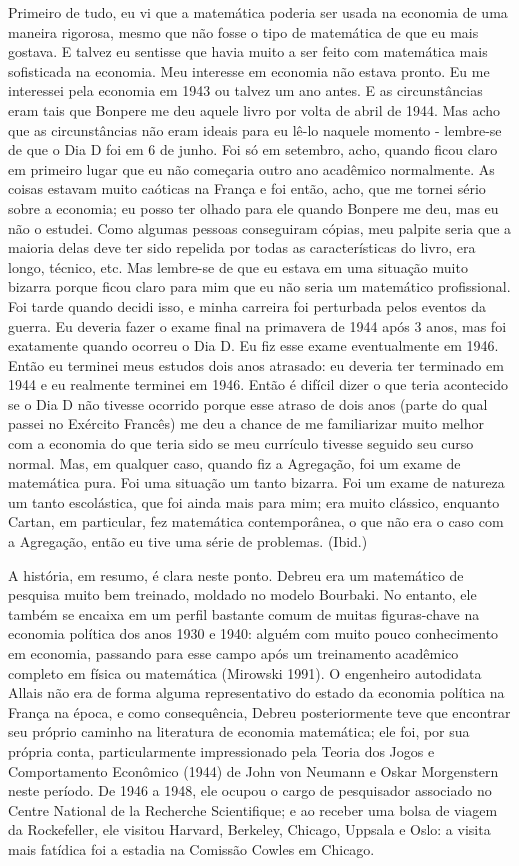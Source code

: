 \documentclass[12pt]{article}
\begin{document}
Primeiro de tudo, eu vi que a matemática poderia ser usada na economia de uma maneira rigorosa, mesmo que não fosse o tipo de matemática de que eu mais gostava. E talvez eu sentisse que havia muito a ser feito com matemática mais sofisticada na economia. Meu interesse em economia não estava pronto. Eu me interessei pela economia em 1943 ou talvez um ano antes. E as circunstâncias eram tais que Bonpere me deu aquele livro por volta de abril de 1944. Mas acho que as circunstâncias não eram ideais para eu lê-lo naquele momento - lembre-se de que o Dia D foi em 6 de junho. Foi só em setembro, acho, quando ficou claro em primeiro lugar que eu não começaria outro ano acadêmico normalmente. As coisas estavam muito caóticas na França e foi então, acho, que me tornei sério sobre a economia; eu posso ter olhado para ele quando Bonpere me deu, mas eu não o estudei. Como algumas pessoas conseguiram cópias, meu palpite seria que a maioria delas deve ter sido repelida por todas as características do livro, era longo, técnico, etc. Mas lembre-se de que eu estava em uma situação muito bizarra porque ficou claro para mim que eu não seria um matemático profissional. Foi tarde quando decidi isso, e minha carreira foi perturbada pelos eventos da guerra. Eu deveria fazer o exame final na primavera de 1944 após 3 anos, mas foi exatamente quando ocorreu o Dia D. Eu fiz esse exame eventualmente em 1946. Então eu terminei meus estudos dois anos atrasado: eu deveria ter terminado em 1944 e eu realmente terminei em 1946. Então é difícil dizer o que teria acontecido se o Dia D não tivesse ocorrido porque esse atraso de dois anos (parte do qual passei no Exército Francês) me deu a chance de me familiarizar muito melhor com a economia do que teria sido se meu currículo tivesse seguido seu curso normal. Mas, em qualquer caso, quando fiz a Agregação, foi um exame de matemática pura. Foi uma situação um tanto bizarra. Foi um exame de natureza um tanto escolástica, que foi ainda mais para mim; era muito clássico, enquanto Cartan, em particular, fez matemática contemporânea, o que não era o caso com a Agregação, então eu tive uma série de problemas. (Ibid.)

A história, em resumo, é clara neste ponto. Debreu era um matemático de pesquisa muito bem treinado, moldado no modelo Bourbaki. No entanto, ele também se encaixa em um perfil bastante comum de muitas figuras-chave na economia política dos anos 1930 e 1940: alguém com muito pouco conhecimento em economia, passando para esse campo após um treinamento acadêmico completo em física ou matemática (Mirowski 1991). O engenheiro autodidata Allais não era de forma alguma representativo do estado da economia política na França na época, e como consequência, Debreu posteriormente teve que encontrar seu próprio caminho na literatura de economia matemática; ele foi, por sua própria conta, particularmente impressionado pela Teoria dos Jogos e Comportamento Econômico (1944) de John von Neumann e Oskar Morgenstern neste período. De 1946 a 1948, ele ocupou o cargo de pesquisador associado no Centre National de la Recherche Scientifique; e ao receber uma bolsa de viagem da Rockefeller, ele visitou Harvard, Berkeley, Chicago, Uppsala e Oslo: a visita mais fatídica foi a estadia na Comissão Cowles em Chicago.
\end{document}
